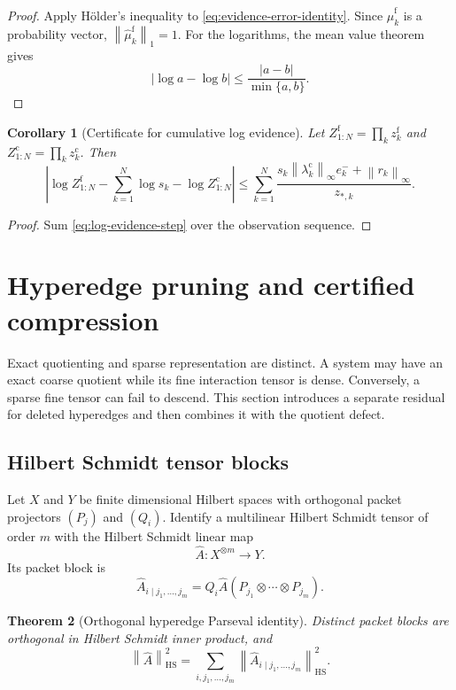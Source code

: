 \documentclass[11pt]{article}
\newtheorem{theorem}{Theorem}[section]
\newtheorem{corollary}[theorem]{Corollary}
\theoremstyle{definition}
\theoremstyle{remark}
\newcommand{\norm}[1]{\left\lVert #1\right\rVert}
\newcommand{\abs}[1]{\left\lvert #1\right\rvert}
\newcommand{\fine}{\mathrm f}
\newcommand{\coarse}{\mathrm c}
\begin{document}
\begin{proof}
Apply Hölder's inequality to \eqref{eq:evidence-error-identity}.  Since $\widehat\mu_k^{\fine}$ is a probability vector, $\norm{\widehat\mu_k^{\fine}}_1=1$.  For the logarithms, the mean value theorem gives
\[
  \abs{\log a-\log b}
  \leq\frac{\abs{a-b}}{\min\{a,b\}}.
\]
\end{proof}

\begin{corollary}[Certificate for cumulative log evidence]\label{cor:cumulative-evidence}
Let $Z_{1:N}^{\fine}=\prod_kz_k^{\fine}$ and $Z_{1:N}^{\coarse}=\prod_kz_k^{\coarse}$.  Then
\begin{equation}\label{eq:cumulative-evidence}
  \boxed{
  \abs{
  \log Z_{1:N}^{\fine}
  -\sum_{k=1}^N\log s_k
  -\log Z_{1:N}^{\coarse}}
  \leq
  \sum_{k=1}^N
  \frac{
  s_k\norm{\lambda_k^{\coarse}}_{\infty}e_k^-
  +\norm{r_k}_{\infty}
  }{z_{*,k}}.}
\end{equation}
\end{corollary}

\begin{proof}
Sum \eqref{eq:log-evidence-step} over the observation sequence.
\end{proof}

\section{Hyperedge pruning and certified compression}\label{sec:pruning}

Exact quotienting and sparse representation are distinct.  A system may have an exact coarse quotient while its fine interaction tensor is dense.  Conversely, a sparse fine tensor can fail to descend.  This section introduces a separate residual for deleted hyperedges and then combines it with the quotient defect.

\subsection{Hilbert Schmidt tensor blocks}
Let $X$ and $Y$ be finite dimensional Hilbert spaces with orthogonal packet projectors $(P_j)$ and $(Q_i)$.  Identify a multilinear Hilbert Schmidt tensor of order $m$ with the Hilbert Schmidt linear map
\[
  \widehat A:X^{\otimes m}\to Y.
\]
Its packet block is
\[
  \widehat A_{i\mid j_1,\ldots,j_m}
  =
  Q_i\widehat A(P_{j_1}\otimes\cdots\otimes P_{j_m}).
\]

\begin{theorem}[Orthogonal hyperedge Parseval identity]\label{thm:hyperedge-parseval}
Distinct packet blocks are orthogonal in Hilbert Schmidt inner product, and
\begin{equation}\label{eq:hyperedge-parseval}
  \boxed{
  \norm{\widehat A}_{\mathrm{HS}}^2
  =
  \sum_{i,j_1,\ldots,j_m}
  \norm{\widehat A_{i\mid j_1,\ldots,j_m}}_{\mathrm{HS}}^2.}
\end{equation}
\end{theorem}
\end{document}
